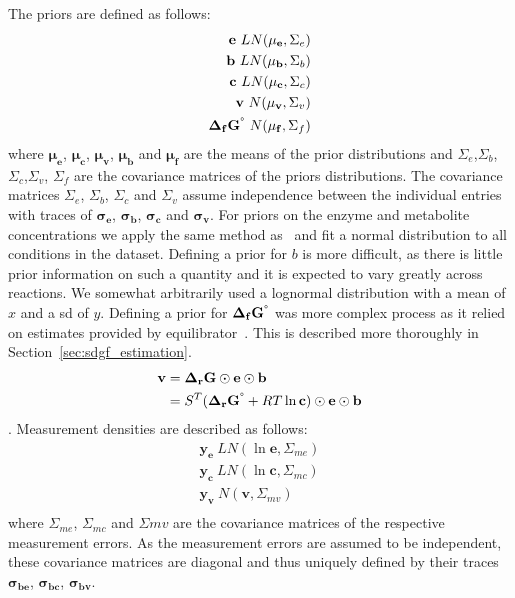 \documentclass[10pt,letterpaper]{article}
\newcommand{\sdgf}{\Delta_fG^{\degree}}
\newcommand{\dgr}{\Delta_rG}
\newcommand{\sdgr}{\Delta_rG^{\degree}}
\newcommand{\bsdgf}{\mathbf{\sdgf}}
\newcommand{\bdgr}{\mathbf{\dgr}}
\newcommand{\bsdgr}{\mathbf{\sdgr}}
\newcommand{\be}{\mathbf{e}}
\newcommand{\bc}{\mathbf{c}}
\newcommand{\bb}{\mathbf{b}}
\newcommand{\bv}{\mathbf{v}}
\begin{document}
The priors are defined as follows:
\begin{align*}
    \be ~ LN(\mathbf{\mu_e}, \Sigma_e) \\
    \bb ~ LN(\mathbf{\mu_b}, \Sigma_b) \\
    \bc ~ LN(\mathbf{\mu_c}, \Sigma_c) \\
    \bv ~ N(\mathbf{\mu_v}, \Sigma_v) \\
    \bsdgf ~ N(\mathbf{\mu_{f}}, \Sigma_{f}) \\
\end{align*}
where $\mathbf{\mu_e}$, $\mathbf{\mu_c}$, $\mathbf{\mu_v}$, $\mathbf{\mu_b}$ and $\mathbf{\mu_f}$ are the means of the prior distributions and $\Sigma_e$,$\Sigma_b$, $\Sigma_c$,$\Sigma_v$, $\Sigma_f$ are the covariance matrices of the priors distributions.
The covariance matrices $\Sigma_e$, $\Sigma_b$, $\Sigma_c$ and $\Sigma_v$ assume independence between the individual entries with traces of $\mathbf{\sigma_e}$, $\mathbf{\sigma_b}$, $\mathbf{\sigma_c}$ and $\mathbf{\sigma_v}$.
For priors on the enzyme and metabolite concentrations we apply the same method as~\cite{PTA} and fit a normal distribution to all conditions in the dataset. %
Defining a prior for $b$ is more difficult, as there is little prior information on such a quantity and it is expected to vary greatly across reactions.
We somewhat arbitrarily used a lognormal distribution with a mean of $x$ and a sd of $y$. %
Defining a prior for $\bsdgf$ was more complex process as it relied on estimates provided by equilibrator~\cite{noor_2013_equilibrator}.
This is described more thoroughly in Section~\ref{sec:sdgf_estimation}.
\begin{align}
    \bv &= \bdgr \odot \be \odot \bb \\
        &= S^T (\bsdgr + RT\ln{\bc}) \odot \be \odot \bb \\
\end{align}
.
Measurement densities are described as follows:
\begin{align*}
    \mathbf{y_{e}} ~ LN(\ln{\be}, \Sigma_{me}) \\
    \mathbf{y_{c}} ~ LN(\ln{\bc}, \Sigma_{mc}) \\
    \mathbf{y_{v}} ~ N(\bv, \Sigma_{mv}) \\
\end{align*}
where $\Sigma_{me}$, $\Sigma_{mc}$ and $\Sigma{mv}$ are the covariance matrices of the respective measurement errors.
As the measurement errors are assumed to be independent, these covariance matrices are diagonal and thus uniquely defined by their traces $\mathbf{\sigma_{be}}$, $\mathbf{\sigma_{bc}}$, $\mathbf{\sigma_{bv}}$.
\end{document}
